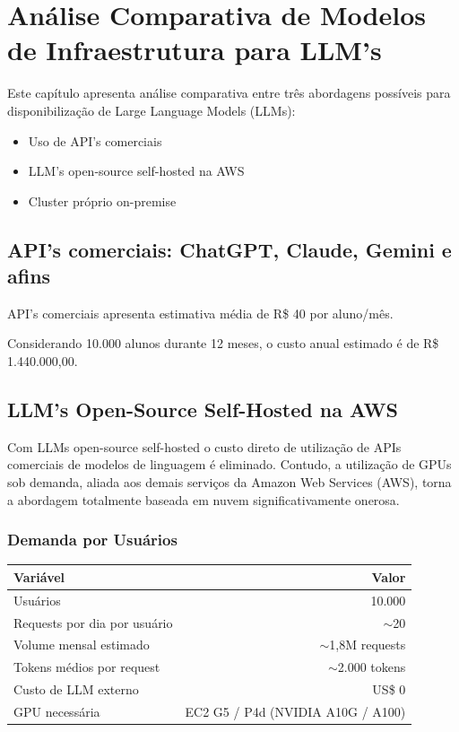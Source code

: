 \chapter{Análise Comparativa de Modelos de Infraestrutura para LLM's}

Este capítulo apresenta análise comparativa entre três abordagens possíveis para disponibilização de Large Language Models (LLMs):

\begin{itemize}
\item Uso de API's comerciais
\item LLM's open-source self-hosted na AWS
\item Cluster próprio on-premise
\end{itemize}

\section{API's comerciais: ChatGPT, Claude, Gemini e afins}
API's comerciais apresenta estimativa média de R\$ 40 por aluno/mês.

Considerando 10.000 alunos durante 12 meses, o custo anual estimado é de R\$ 1.440.000,00.

\section{LLM's Open-Source Self-Hosted na AWS}

Com LLMs open-source self-hosted o custo direto de utilização de APIs comerciais de modelos de linguagem é eliminado. Contudo, a utilização de GPUs sob demanda, aliada aos demais serviços da Amazon Web Services (AWS), torna a abordagem totalmente baseada em nuvem significativamente onerosa.

\subsection{Demanda por Usuários}

\begin{table}[h]
\centering
\begin{tabular}{|l|r|}
\hline
\textbf{Variável} & \textbf{Valor} \\
\hline
Usuários & 10.000 \\
Requests por dia por usuário & $\sim$20 \\
Volume mensal estimado & $\sim$1,8M requests \\
Tokens médios por request & $\sim$2.000 tokens \\
Custo de LLM externo & US\$ 0 \\
GPU necessária & EC2 G5 / P4d (NVIDIA A10G / A100) \\
\hline
\end{tabular}
\end{table}
\newpage

